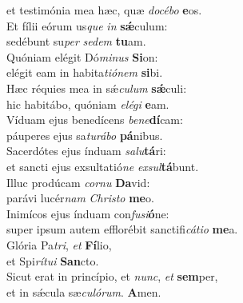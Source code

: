 \evenverse et testimónia mea hæc, quæ \textit{do}\textit{cé}\textit{bo} \textbf{e}os.\\
\oddverse Et fílii eórum us\textit{que} \textit{in} \textbf{sǽ}culum:~\*\\
\oddverse sedébunt su\textit{per} \textit{se}\textit{dem} \textbf{tu}am.\\
\evenverse Quóniam elégit Dó\textit{mi}\textit{nus} \textbf{Si}on:~\*\\
\evenverse elégit eam in habita\textit{ti}\textit{ó}\textit{nem} \textbf{si}bi.\\
\oddverse Hæc réquies mea in sǽ\textit{cu}\textit{lum} \textbf{sǽ}culi:~\*\\
\oddverse hic habitábo, quóniam \textit{e}\textit{lé}\textit{gi} \textbf{e}am.\\
\evenverse Víduam ejus benedícens \textit{be}\textit{ne}\textbf{dí}cam:~\*\\
\evenverse páuperes ejus sa\textit{tu}\textit{rá}\textit{bo} \textbf{pá}nibus.\\
\oddverse Sacerdótes ejus índuam \textit{sa}\textit{lu}\textbf{tá}ri:~\*\\
\oddverse et sancti ejus exsultatió\textit{ne} \textit{ex}\textit{sul}\textbf{tá}bunt.\\
\evenverse Illuc prodúcam \textit{cor}\textit{nu} \textbf{Da}vid:~\*\\
\evenverse parávi lucér\textit{nam} \textit{Chri}\textit{sto} \textbf{me}o.\\
\oddverse Inimícos ejus índuam con\textit{fu}\textit{si}\textbf{ó}ne:~\*\\
\oddverse super ipsum autem efflorébit sanctifi\textit{cá}\textit{ti}\textit{o} \textbf{me}a.\\
\evenverse Glória Pa\textit{tri}, \textit{et} \textbf{Fí}lio,~\*\\
\evenverse et Spi\textit{rí}\textit{tu}\textit{i} \textbf{San}cto.\\
\oddverse Sicut erat in princípio, et \textit{nunc}, \textit{et} \textbf{sem}per,~\*\\
\oddverse et in sǽcula sæ\textit{cu}\textit{ló}\textit{rum}. \textbf{A}men.\\

